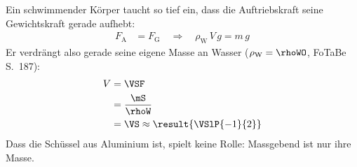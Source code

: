 Ein schwimmender Körper taucht so tief ein, dass die Auftriebskraft seine Gewichtskraft gerade aufhebt:
\begin{align}
 F_\text{A} &= F_\text{G} \quad\Rightarrow\quad \rho_\text{W}\,V\,g = m\,g
\end{align}
Er verdrängt also gerade seine eigene Masse an Wasser ($\rho_\text{W} = \rhoWO$, FoTaBe S.~187):
\begin{align}
 V &= \VSF \\
   &= \frac{\mS}{\rhoW} \\
   &= \VS \approx \result{\VSlP{-1}{2}}
\end{align}
Dass die Schüssel aus Aluminium ist, spielt keine Rolle: Massgebend ist nur ihre Masse.
